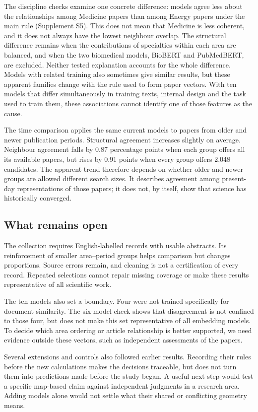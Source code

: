 \documentclass[12pt]{article}
\begin{document}
The discipline checks examine one concrete difference: models agree less about the relationships among Medicine papers than among Energy papers under the main rule (Supplement S5). This does not mean that Medicine is less coherent, and it does not always have the lowest neighbour overlap. The structural difference remains when the contributions of specialties within each area are balanced, and when the two biomedical models, BioBERT and PubMedBERT, are excluded. Neither tested explanation accounts for the whole difference. Models with related training also sometimes give similar results, but these apparent families change with the rule used to form paper vectors. With ten models that differ simultaneously in training texts, internal design and the task used to train them, these associations cannot identify one of those features as the cause.

The time comparison applies the same current models to papers from older and newer publication periods. Structural agreement increases slightly on average. Neighbour agreement falls by 0.87 percentage points when each group offers all its available papers, but rises by 0.91 points when every group offers 2,048 candidates. The apparent trend therefore depends on whether older and newer groups are allowed different search sizes. It describes agreement among present-day representations of those papers; it does not, by itself, show that science has historically converged.

\subsection{What remains open}
The collection requires English-labelled records with usable abstracts. Its reinforcement of smaller area--period groups helps comparison but changes proportions. Source errors remain, and cleaning is not a certification of every record. Repeated selections cannot repair missing coverage or make these results representative of all scientific work.

The ten models also set a boundary. Four were not trained specifically for document similarity. The six-model check shows that disagreement is not confined to those four, but does not make this set representative of all embedding models. To decide which area ordering or article relationship is better supported, we need evidence outside these vectors, such as independent assessments of the papers.

Several extensions and controls also followed earlier results. Recording their rules before the new calculations makes the decisions traceable, but does not turn them into predictions made before the study began. A useful next step would test a specific map-based claim against independent judgments in a research area. Adding models alone would not settle what their shared or conflicting geometry means.
\end{document}
